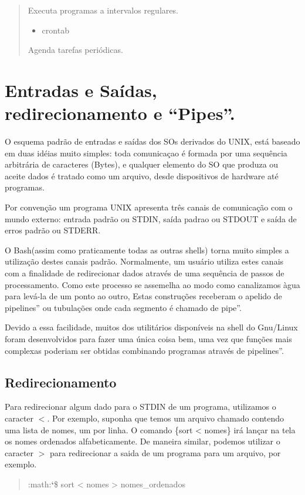 \documentclass[a4paper,10pt,portuguese]{sphinxmanual}
\begin{document}
\begin{quote}
\begin{description}
\begin{itemize}
\end{itemize}

Executa programas a intervalos regulares.
\begin{itemize}
\item {} 
crontab

\end{itemize}

Agenda tarefas periódicas.

\end{description}
\end{quote}


\section{Entradas e Saídas, redirecionamento e ``Pipes''.}
\label{bash:entradas-e-saidas-redirecionamento-e-pipes}
O esquema padrão de entradas e saídas dos SOs derivados do UNIX,
está baseado em duas idéias muito simples: toda comunicaçao é
formada por uma sequência arbitrária de caracteres (Bytes), e
qualquer elemento do SO que produza ou aceite dados é tratado como
um arquivo, desde dispositivos de hardware até programas.

Por convenção um programa UNIX apresenta três canais de comunicação
com o mundo externo: entrada padrão ou STDIN, saída padrao ou
STDOUT e saída de erros padrão ou STDERR.

O Bash(assim como praticamente todas as outras shells) torna muito
simples a utilização destes canais padrão. Normalmente, um usuário
utiliza estes canais com a finalidade de redirecionar dados através
de uma sequência de passos de processamento. Como este processo se
assemelha ao modo como canalizamos àgua para levá-la de um ponto ao
outro, Estas construções receberam o apelido de pipelines'' ou
tubulações onde cada segmento é chamado de pipe''.

Devido a essa facilidade, muitos dos utilitários disponíveis na
shell do Gnu/Linux foram desenvolvidos para fazer uma única coisa
bem, uma vez que funções mais complexas poderiam ser obtidas
combinando programas através de pipelines''.


\subsection{Redirecionamento}
\label{bash:redirecionamento}
Para redirecionar algum dado para o STDIN de um programa,
utilizamos o caracter $<$. Por exemplo, suponha que temos
um arquivo chamado  contendo uma lista de nomes, um por
linha. O comando \{sort \textless{} nomes\} irá lançar na tela os nomes
ordenados alfabeticamente. De maneira similar, podemos utilizar o
caracter $>$ para redirecionar a saida de um programa para
um arquivo, por exemplo.
\begin{quote}

:math:{\color{red}\bfseries{}{}`}\$ sort \textless{} nomes \textgreater{} nomes\_ordenados
\end{quote}
\end{document}
